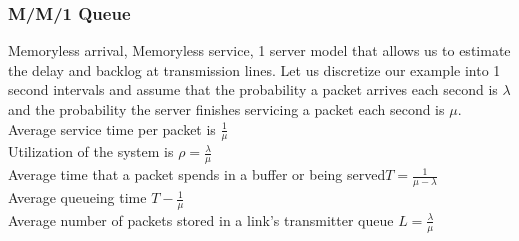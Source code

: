 \subsubsection*{M/M/1 Queue}
Memoryless arrival, Memoryless service, 1 server model that allows us to estimate the delay and backlog at transmission lines. Let us discretize our example into 1 second intervals and assume that the probability a packet arrives each second is $\lambda$ and the probability the server finishes servicing a packet each second is $\mu$. \\
Average service time per packet is $\frac{1}{\mu}$ \\
Utilization of the system is $\rho = \frac{\lambda}{\mu}$ \\
Average time that a packet spends in a buffer or being served$T = \frac{1}{\mu-\lambda}$ \\ 
Average queueing time $T-\frac{1}{\mu}$\\
Average number of packets  stored in a link's transmitter queue $L = \frac{\lambda}{\mu}$



